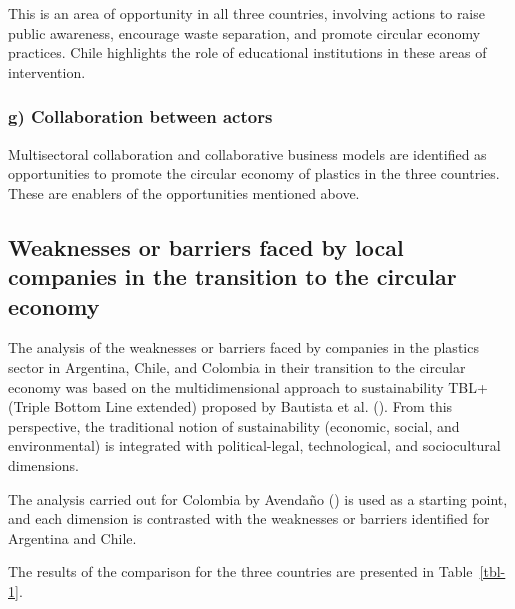 \documentclass[
  12pt,
  oneside]{book}
\begin{document}
This is an area of opportunity in all three countries, involving actions
to raise public awareness, encourage waste separation, and promote
circular economy practices. Chile highlights the role of educational
institutions in these areas of intervention.

\subsubsection{g) Collaboration between
actors}\label{g-collaboration-between-actors}

Multisectoral collaboration and collaborative business models are
identified as opportunities to promote the circular economy of plastics
in the three countries. These are enablers of the opportunities
mentioned above.

\subsection{Weaknesses or barriers faced by local companies in the
transition to the circular
economy}\label{weaknesses-or-barriers-faced-by-local-companies-in-the-transition-to-the-circular-economy}

The analysis of the weaknesses or barriers faced by companies in the
plastics sector in Argentina, Chile, and Colombia in their transition to
the circular economy was based on the multidimensional approach to
sustainability TBL+ (Triple Bottom Line extended) proposed by Bautista
et al. (). From this perspective, the
traditional notion of sustainability (economic, social, and
environmental) is integrated with political-legal, technological, and
sociocultural dimensions.

The analysis carried out for Colombia by Avendaño
() is used as a starting point, and
each dimension is contrasted with the weaknesses or barriers identified
for Argentina and Chile.

The results of the comparison for the three countries are presented in
Table~\ref{tbl-1}.
\end{document}
